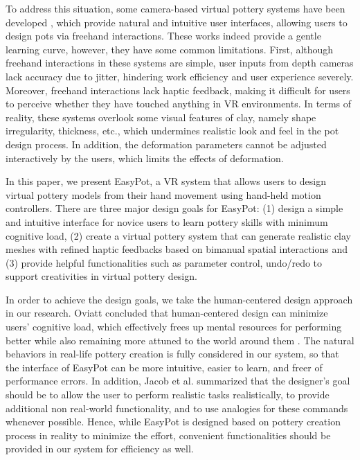 \documentclass{svjour3}                     %
\begin{document}
To address this situation, some camera-based virtual pottery systems have been developed \cite{ramani2015gesture,murugappan2013handy,han2014virtual}, which provide natural and intuitive user interfaces, allowing users to design pots via freehand interactions.
These works indeed provide a gentle learning curve, however, they have some common limitations.
First, although freehand interactions in these systems are simple, user inputs from depth cameras lack accuracy due to jitter, hindering work efficiency and user experience severely.
%
Moreover, freehand interactions lack haptic feedback, making it difficult for users to perceive whether they have touched anything in VR environments. In terms of reality, these systems overlook some visual features of clay, namely shape irregularity, thickness, etc., which undermines realistic look and feel in the pot design process.
%
In addition, the deformation parameters cannot be adjusted interactively by the users, which limits the effects of deformation.

In this paper, we present EasyPot, a VR system that allows users to design virtual pottery models from their hand movement using hand-held motion controllers. There are three major design goals for EasyPot:
(1) design a simple and intuitive interface for novice users to learn pottery skills with minimum cognitive load,
(2) create a virtual pottery system that can generate realistic clay meshes with refined haptic feedbacks based on bimanual spatial interactions 
and (3) provide helpful functionalities such as parameter control, undo/redo to support creativities in virtual pottery design.

In order to achieve the design goals, we take the human-centered design approach in our research.
Oviatt concluded that human-centered design can minimize users’ cognitive load, which effectively frees up mental resources for performing better while also remaining more attuned to the world around them \cite{oviatt2006human}.
The natural behaviors in real-life pottery creation is fully considered in our system, so that the interface of EasyPot can be more intuitive, easier to learn, and freer of performance errors.
In addition, Jacob et al. \cite{Jacob2008Reality} summarized that the designer's goal should be to allow the user to perform realistic tasks realistically, to provide additional non real-world functionality, and to use analogies for these commands whenever possible.
Hence, while EasyPot is designed based on pottery creation process in reality to minimize the effort, convenient functionalities should be provided in our system for efficiency as well.
\end{document}
